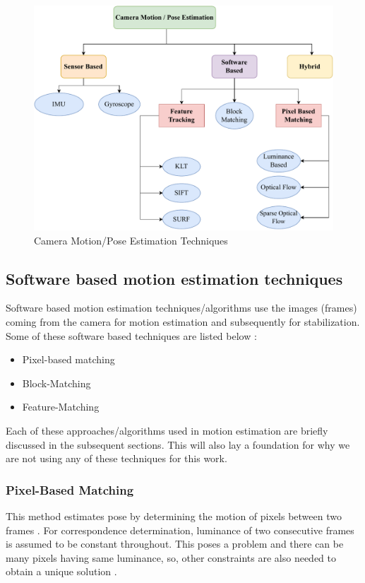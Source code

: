 \begin{figure}[H]
\centering
\includegraphics[scale=0.7]{images/fig_chapter2/cam_pose_estimation.pdf}
\caption{Camera Motion/Pose Estimation Techniques}
\label{fig:cam_pose_est}
\end{figure}


\subsection{Software based motion estimation techniques}
\label{sec:software_motion_estimation}
Software based motion estimation techniques/algorithms use the images (frames) coming from the camera for motion estimation and subsequently for stabilization. Some of these software based techniques are listed below \citep{dis_review}:

\begin{itemize}
\item Pixel-based matching
\item Block-Matching
\item Feature-Matching
\end{itemize}

Each of these approaches/algorithms used in motion estimation are briefly discussed in the subsequent sections. This will also lay a foundation for why we are not using any of these techniques for this work.

\subsubsection{Pixel-Based Matching}
This method estimates pose by determining the motion of pixels between two frames \citep{dis_review}. For correspondence determination, luminance of two consecutive frames is assumed to be constant throughout. This poses a problem and there can be many pixels having same luminance, so, other constraints are also needed to obtain a unique solution \citep{dis_review}. 

